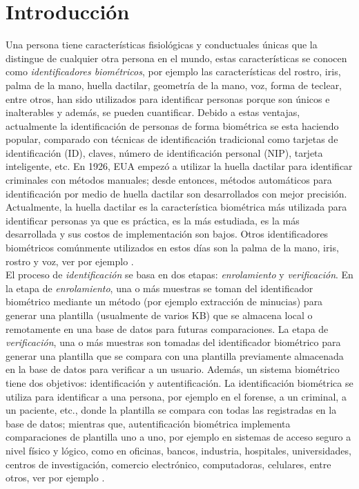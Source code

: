 \section{Introducción}
Una persona tiene características fisiológicas y conductuales únicas que la distingue de cualquier otra persona en el mundo, estas características se conocen como \textit{identificadores biométricos}, por ejemplo las características del rostro, iris, palma de la mano, huella dactilar, geometría de la mano, voz, forma de teclear, entre otros, han sido utilizados para identificar personas porque son únicos e inalterables y además, se pueden cuantificar. Debido a estas ventajas, actualmente la identificación de personas de forma biométrica se esta haciendo popular, comparado con técnicas de identificación tradicional como tarjetas de identificación (ID), claves, número de identificación personal (NIP), tarjeta inteligente, etc. En 1926, EUA empezó a utilizar la huella dactilar para identificar criminales con métodos manuales; desde entonces, métodos automáticos para identificación por medio de huella dactilar son desarrollados con mejor precisión. Actualmente, la huella dactilar es la característica biométrica más utilizada para identificar personas ya que es práctica, es la más estudiada, es la más desarrollada y sus costos de implementación son bajos. Otros identificadores biométricos comúnmente utilizados en estos días son la palma de la mano, iris, rostro y voz, ver por ejemplo \cite{IyC_2013, JyU_2003}. \\

El proceso de \textit{identificación} se basa en dos etapas: \textit{enrolamiento} y \textit{verificación}. En la etapa de \textit{enrolamiento}, una o más muestras se toman del identificador biométrico mediante un método (por ejemplo extracción de minucias) para generar una plantilla (usualmente de varios KB) que se almacena local o remotamente en una base de datos para futuras comparaciones. La etapa de \textit{verificación}, una o más muestras son tomadas del identificador biométrico para generar una plantilla que se compara con una plantilla previamente almacenada en la base de datos para verificar a un usuario. Además, un sistema biométrico tiene dos objetivos: identificación y autentificación. La identificación biométrica se utiliza para identificar a una persona, por ejemplo en el forense, a un criminal, a un paciente, etc., donde la plantilla se compara con todas las registradas en la base de datos; mientras que, autentificación biométrica implementa comparaciones de plantilla uno a uno, por ejemplo en sistemas de acceso seguro a nivel físico y lógico, como en oficinas, bancos, industria, hospitales, universidades, centros de investigación, comercio electrónico, computadoras, celulares, entre otros, ver por ejemplo \cite{SEtAl_1999}. \\      


